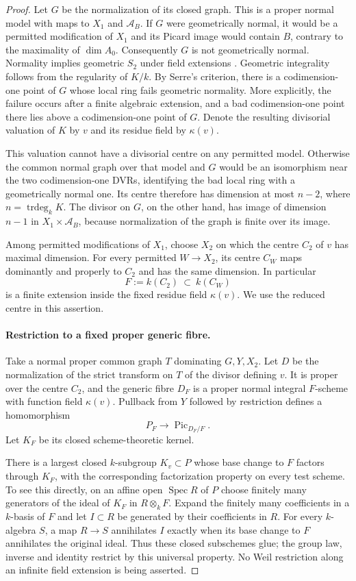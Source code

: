 \begin{proof}
Let $G$ be the normalization of its closed graph.  This is a
proper normal model with maps to $X_1$ and $\mathcal A_B$.
If $G$ were geometrically normal, it would be a permitted
modification of $X_1$ and its Picard image would contain $B$,
contrary to the maximality of $\dim A_0$.
Consequently $G$ is not geometrically normal.
Normality implies geometric $S_2$ under field extensions
\cite[Tags 045M and 0339]{StacksB}.  Geometric integrality
follows from the regularity of $K/k$.  By Serre's criterion,
there is a codimension-one point of $G$ whose local ring fails
geometric normality.  More explicitly, the failure occurs after
a finite algebraic extension, and a bad codimension-one point
there lies above a codimension-one point of $G$.
Denote the resulting divisorial valuation of $K$ by $v$ and its
residue field by $\kappa(v)$.

This valuation cannot have a divisorial centre on any permitted
model.  Otherwise the common normal graph over that model and
$G$ would be an isomorphism near the two codimension-one DVRs,
identifying the bad local ring with a geometrically normal one.
Its centre therefore has dimension at most $n-2$, where
$n=\operatorname{trdeg}_k K$.
The divisor on $G$, on the other hand, has image of dimension
$n-1$ in $X_1\times\mathcal A_B$, because normalization of
the graph is finite over its image.

Among permitted modifications of $X_1$, choose $X_2$ on which
the centre $C_2$ of $v$ has maximal dimension.  For every
permitted $W\to X_2$, its centre $C_W$ maps dominantly and
properly to $C_2$ and has the same dimension.  In particular
\[
                 F:=k(C_2)\ \subset\ k(C_W)
\]
is a finite extension inside the fixed residue field $\kappa(v)$.
We use the reduced centre in this assertion.

\paragraph{Restriction to a fixed proper generic fibre.}
Take a normal proper common graph $T$ dominating $G,Y,X_2$.
Let $D$ be the normalization of the strict transform on $T$
of the divisor defining $v$.  It is proper over the centre
$C_2$, and the generic fibre $D_F$ is a proper normal integral
$F$-scheme with function field $\kappa(v)$.
Pullback from $Y$ followed by restriction defines a homomorphism
\[
                P_F\longrightarrow\operatorname{Pic}_{D_F/F}.
\]
Let $K_F$ be its closed scheme-theoretic kernel.

There is a largest closed $k$-subgroup $K_v\subset P$ whose
base change to $F$ factors through $K_F$, with the corresponding
factorization property on every test scheme.
To see this directly, on an affine open $\operatorname{Spec}R$
of $P$ choose finitely many generators of the ideal of $K_F$
in $R\otimes_k F$.  Expand the finitely many coefficients in
a $k$-basis of $F$ and let $I\subset R$ be generated by their
coefficients in $R$.  For every $k$-algebra $S$, a map $R\to S$
annihilates $I$ exactly when its base change to $F$ annihilates
the original ideal.  Thus these closed subschemes glue; the
group law, inverse and identity restrict by this universal
property.  No Weil restriction along an infinite field
extension is being asserted.


\end{proof}
